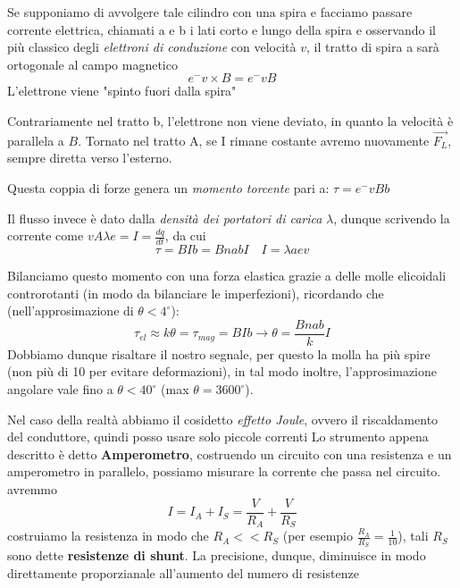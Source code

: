 \documentclass{article}
\begin{document}
Se supponiamo di avvolgere tale cilindro con una spira e facciamo passare corrente elettrica, chiamati a e b i lati corto e lungo della spira e 
osservando il più classico degli \textit{elettroni di conduzione} con velocità $v$, il tratto di spira a sarà ortogonale al campo magnetico 
\[
e^- v \times B = e^- v B 
\]
L'elettrone viene "spinto fuori dalla spira"

Contrariamente nel tratto b, l'elettrone non viene deviato, in quanto la velocità è parallela a $B$. Tornato nel tratto A, se I rimane costante avremo nuovamente $\vec{F_L}$, sempre diretta verso l'esterno.

Questa coppia di forze genera un \textit{momento torcente} pari a: $\tau = e^- v B b $

Il flusso invece è dato dalla \textit{densità dei portatori di carica} $\lambda$, dunque scrivendo la corrente come $ v A \lambda e =I = \frac{dq}{dt}$, da cui
\[
\tau = B I b = B n a b I \quad I = \lambda a e v 
\]

Bilanciamo questo momento con una forza elastica grazie a delle molle elicoidali controrotanti (in modo da bilanciare le imperfezioni), ricordando che (nell'approsimazione di $\theta < 4^\circ$):
\[
\tau_{el} \approx k \theta = \tau_{mag} = B I b \rightarrow \theta = \frac{B n a b}{k} I
\]
Dobbiamo dunque risaltare il nostro segnale, per questo la molla ha più spire (non più di 10 per evitare deformazioni), in tal modo inoltre, l'approsimazione angolare vale fino a $\theta < 40^\circ$ (max $\theta = 3600^\circ$).

Nel caso della realtà abbiamo il cosidetto \textit{effetto Joule}, ovvero il riscaldamento del conduttore, quindi posso usare solo piccole correnti 
Lo strumento appena descritto è detto \textbf{Amperometro}, costruendo un circuito con una resistenza e un amperometro in parallelo, possiamo misurare la corrente che passa nel circuito.
avremmo
\[
I= I_A + I_S= \frac{V}{R_A}+ \frac{V}{R_S}
\]
costruiamo la resistenza in modo che $R_A << R_S$ (per esempio $\frac{R_A}{R_S}=\frac{1}{10}$), tali $R_S$ sono dette \textbf{resistenze di shunt}. La precisione, dunque, diminuisce in modo direttamente proporzianale all'aumento del numero di resistenze 
\end{document}
